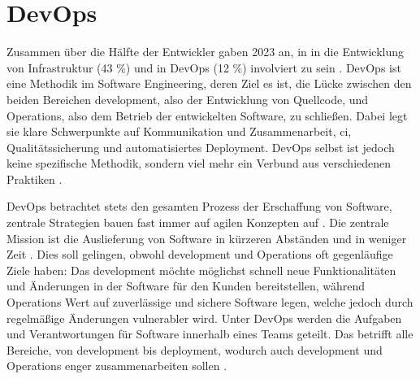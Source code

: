 \section{DevOps}
\label{sec:03-01_devops}

Zusammen über die Hälfte der Entwickler gaben 2023 an, in in die Entwicklung von Infrastruktur (43 \%) und in DevOps (12 \%) involviert zu sein \cite{207:Developer-Ecosystem}. DevOps ist eine Methodik im Software Engineering, deren Ziel es ist, die Lücke zwischen den beiden Bereichen \Gls{development}, also der Entwicklung von Quellcode, und Operations, also dem Betrieb der entwickelten Software, zu schließen. Dabei legt sie klare Schwerpunkte auf Kommunikation und Zusammenarbeit, \acrlong{ci}, Qualitätssicherung und automatisiertes Deployment. DevOps selbst ist jedoch keine spezifische Methodik, sondern viel mehr ein Verbund aus verschiedenen Praktiken \cite{001:DevOps-Adoption-in-Software-Development}.

DevOps betrachtet stets den gesamten Prozess der Erschaffung von Software, zentrale Strategien bauen fast immer auf agilen Konzepten auf \cite{001:DevOps-Adoption-in-Software-Development}. Die zentrale Mission ist die Auslieferung von Software in kürzeren Abständen und in weniger Zeit \cite{006:Prevalence-of-GitOps-DevOps-in-Fast-CI-CD-Cycles}. Dies soll gelingen, obwohl \Gls{development} und Operations oft gegenläufige Ziele haben: Das \Gls{development} möchte möglichst schnell neue Funktionalitäten und Änderungen in der Software für den Kunden bereitstellen, während Operations Wert auf zuverlässige und sichere Software legen, welche jedoch durch regelmäßige Änderungen vulnerabler wird. Unter DevOps werden die Aufgaben und Verantwortungen für Software innerhalb eines Teams geteilt. Das betrifft alle Bereiche, von \Gls{development} bis \Gls{deployment}, wodurch auch \Gls{development} und Operations enger zusammenarbeiten sollen \cite{000:CI-CD-Deployment-in-DevOps-reduce-Gap-Developer-Operation}.

